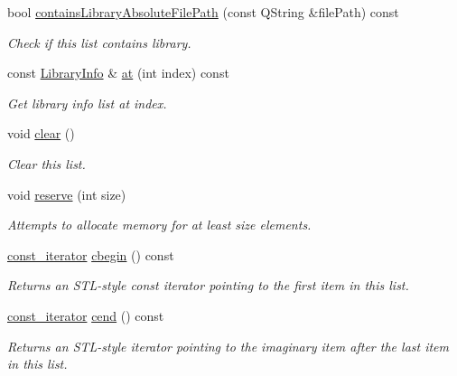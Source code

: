 \begin{DoxyCompactItemize}
bool \hyperlink{class_mdt_1_1_deploy_utils_1_1_library_info_list_a2bdcf5564dd1846be16fc5544120fe03}{contains\+Library\+Absolute\+File\+Path} (const Q\+String \&file\+Path) const 
\begin{DoxyCompactList}\small\item\em Check if this list contains library. \end{DoxyCompactList}\item 
const \hyperlink{class_mdt_1_1_deploy_utils_1_1_library_info}{Library\+Info} \& \hyperlink{class_mdt_1_1_deploy_utils_1_1_library_info_list_a9c8d42963dc6318d45d90f3e63aa5569}{at} (int index) const 
\begin{DoxyCompactList}\small\item\em Get library info list at index. \end{DoxyCompactList}\item 
void \hyperlink{class_mdt_1_1_deploy_utils_1_1_library_info_list_ac6d89745bccdd70bcf08d5bbe6f9a539}{clear} ()
\begin{DoxyCompactList}\small\item\em Clear this list. \end{DoxyCompactList}\item 
void \hyperlink{class_mdt_1_1_deploy_utils_1_1_library_info_list_ab98b4f9f2c911281467301b4c4a485f2}{reserve} (int size)
\begin{DoxyCompactList}\small\item\em Attempts to allocate memory for at least size elements. \end{DoxyCompactList}\item 
\hyperlink{class_mdt_1_1_deploy_utils_1_1_library_info_list_a07338b20f243a1c7fcb3f696a35ddd44}{const\+\_\+iterator} \hyperlink{class_mdt_1_1_deploy_utils_1_1_library_info_list_a3e40ff4b11d26a0e2acecc7aaf78248b}{cbegin} () const 
\begin{DoxyCompactList}\small\item\em Returns an S\+T\+L-\/style const iterator pointing to the first item in this list. \end{DoxyCompactList}\item 
\hyperlink{class_mdt_1_1_deploy_utils_1_1_library_info_list_a07338b20f243a1c7fcb3f696a35ddd44}{const\+\_\+iterator} \hyperlink{class_mdt_1_1_deploy_utils_1_1_library_info_list_a77c1177f462f83424ce183b1c33f3e6c}{cend} () const 
\begin{DoxyCompactList}\small\item\em Returns an S\+T\+L-\/style iterator pointing to the imaginary item after the last item in this list. \end{DoxyCompactList}\item 

\end{DoxyCompactItemize}
